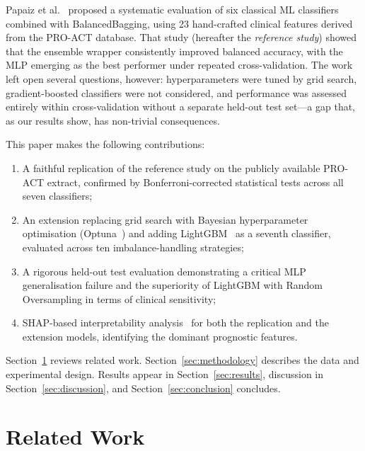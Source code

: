 \documentclass[a4paper,twoside]{article}
\begin{document}
Papaiz et al.~\cite{Papaiz2024} proposed a systematic evaluation of six
classical ML classifiers combined with BalancedBagging, using 23 hand-crafted
clinical features derived from the PRO-ACT database. That study (hereafter the \emph{reference study}) showed that the ensemble wrapper
consistently improved balanced accuracy, with the MLP emerging as the best
performer under repeated cross-validation. The work left open several questions,
however: hyperparameters were tuned by grid search, gradient-boosted classifiers
were not considered, and performance was assessed entirely within cross-validation
without a separate held-out test set---a gap that, as our results show, has
non-trivial consequences.

This paper makes the following contributions:
\begin{enumerate}
  \item A faithful replication of the reference study on the publicly available
    PRO-ACT extract, confirmed by Bonferroni-corrected statistical tests across
    all seven classifiers;
  \item An extension replacing grid search with Bayesian hyperparameter
    optimisation (Optuna~\cite{optuna2019}) and adding LightGBM~\cite{ke2017lightgbm}
    as a seventh classifier, evaluated across ten imbalance-handling strategies;
  \item A rigorous held-out test evaluation demonstrating a critical MLP
    generalisation failure and the superiority of LightGBM with Random
    Oversampling in terms of clinical sensitivity;
  \item SHAP-based interpretability analysis~\cite{lundberg2017shap,lundberg2020treeshap} for both the replication and the extension models,
    identifying the dominant prognostic features.
\end{enumerate}

Section~\ref{sec:related} reviews related work. Section~\ref{sec:methodology}
describes the data and experimental design. Results appear in
Section~\ref{sec:results}, discussion in Section~\ref{sec:discussion}, and
Section~\ref{sec:conclusion} concludes.


\section{Related Work}
\label{sec:related}
\end{document}
